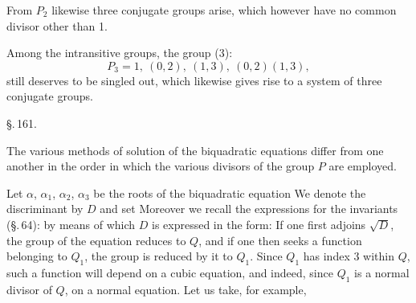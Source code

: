 From $P_2$ likewise three conjugate groups arise, which however have no common divisor other than 1.


Among the intransitive groups, the group (3):
\[
P_3 = 1, \ (0,2), \ (1,3), \ (0,2)(1,3),
\]
still deserves to be singled out, which likewise gives rise to a system of three conjugate groups.

\begin{center}
\S.\,161.

\end{center}

The various methods of solution of the biquadratic equations differ from one another in the order in which the various divisors of the group $P$ are employed.

Let $\alpha$, $\alpha_1$, $\alpha_2$, $\alpha_3$ be the roots of the biquadratic equation
We denote the discriminant by $D$ and set
Moreover we recall the expressions for the invariants (\S.\,64):
by means of which $D$ is expressed in the form:
If one first adjoins $\sqrt{D}$, the group of the equation reduces to $Q$, and if one then seeks a function belonging to $Q_1$, the group is reduced by it to $Q_1$. Since $Q_1$ has index 3 within $Q$, such a function will depend on a cubic equation, and indeed, since $Q_1$ is a normal divisor of $Q$, on a normal equation. Let us take, for example,
